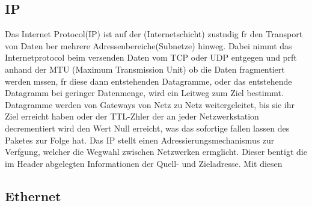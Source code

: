 \documentclass[a4paper]{book}%
\begin{document}
\subsection{IP}
Das Internet Protocol(IP) ist auf der (Internetschicht) zustndig fr den Transport von Daten ber mehrere Adressenbereiche(Subnetze) hinweg. Dabei nimmt das Internetprotocol beim versenden Daten vom TCP oder UDP entgegen und prft anhand der MTU (Maximum Transmission Unit) ob die Daten fragmentiert werden mssen, fr diese dann entstehenden Datagramme, oder das entstehende Datagramm bei geringer Datenmenge, wird ein Leitweg zum Ziel bestimmt. Datagramme werden von Gateways von Netz zu Netz weitergeleitet, bis sie ihr Ziel erreicht haben oder der TTL-Zhler der an jeder Netzwerkstation decrementiert wird den Wert Null erreicht, was das sofortige fallen lassen des Paketes zur Folge hat. Das IP stellt einen Adressierungsmechanismus zur Verfgung, welcher die Wegwahl zwischen Netzwerken ermglicht. Dieser bentigt die im Header abgelegten Informationen der Quell- und Zieladresse. Mit diesen 

\subsection{Ethernet}
\end{document}

